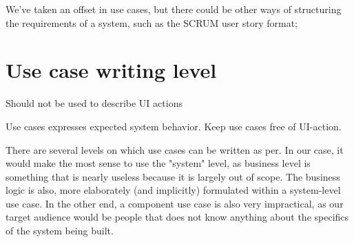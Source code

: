 \documentclass[10pt]{scrreprt}
\begin{document}
We've taken an offset in use cases, but there could be other ways of structuring the requirements of a system, such as the SCRUM user story format;


\section{Use case writing level}
Should not be used to describe UI actions%

Use cases expresses expected system behavior. Keep use cases free of UI-action.

There are several levels on which use cases can be written as per\cite{cockburn??}. In our case, it would make the most sense to use the "system" level, as business level is something that is nearly useless because it is largely out of scope. The business logic is also, more elaborately (and implicitly) formulated within a system-level use case. In the other end, a component use case is also very impractical, as our target audience would be people that does not know anything about the specifics of the system being built.
\end{document}

